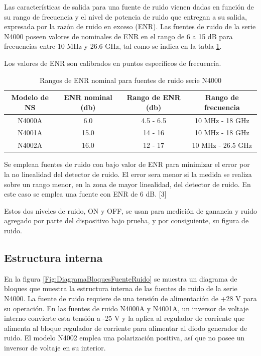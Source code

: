 	Las características de salida para una fuente de ruido vienen dadas en función de su rango de frecuencia y el nivel de potencia de ruido que entregan a su salida, expresada por la razón de ruido en exceso (ENR). Las fuentes de ruido de la serie N4000 poseen valores de nominales de ENR en el rango de 6 a 15 \si{\dB} para frecuencias entre 10 \si{\mega\hertz} y 26.6 \si{\giga\hertz}, tal como se indica en la tabla \ref{Tab:RangosFuentesRuido}.
	
	Los valores de ENR son calibrados en puntos específicos de frecuencia.
	
	\begin{table}[h!]
		\centering
		\begin{tabular}{cccc}
			\toprule
			Modelo de NS	&	ENR nominal (\si{\decibel})	& Rango de ENR (\si{\decibel})	&	Rango de frecuencia			\\
			\midrule	
			N4000A 	&	6.0	&	4.5 - 6.5	&	10 \si{\mega\hertz} - 18 \si{\giga\hertz} \\
			\midrule				
			N4001A 	&	15.0	&	14 - 16	&	10 \si{\mega\hertz} - 18 \si{\giga\hertz} \\
			\midrule	
			N4002A 	&	16.0	&	12 - 17	&	10 \si{\mega\hertz} - 26.5 \si{\giga\hertz} \\
			\bottomrule			
		\end{tabular}
		\caption{Rangos de ENR nominal para fuentes de ruido serie N4000}
		\label{Tab:RangosFuentesRuido}
	\end{table}
	
	Se emplean fuentes de ruido con bajo valor de ENR para minimizar el error por la no linealidad del detector de ruido. El error sera menor si la medida se realiza sobre un rango menor, en la zona de mayor linealidad, del detector de ruido. En este caso se emplea una fuente con ENR de 6 dB. [3]
	
	Estos dos niveles de ruido, ON y OFF, se usan para medición de ganancia y ruido agregado por parte del dispositivo bajo prueba, y por consiguiente, su figura de ruido.	
	
	\subsection{Estructura interna}
			
	En la figura \ref{Fig:DiagramaBloquesFuenteRuido} se muestra un diagrama de bloques que muestra la estructura interna de las fuentes de ruido de la serie N4000. La fuente de ruido requiere de una tensión de alimentación de +28 \si{\volt} para su operación. En las fuentes de ruido N4000A y N4001A, un inversor de voltaje interno convierte esta tensión a -25 \si{\volt} y la aplica al regulador de corriente que alimenta al bloque regulador de corriente para alimentar al diodo generador de ruido. El modelo N4002 emplea una polarización positiva, así que no posee un inversor de voltaje en su interior.
	
